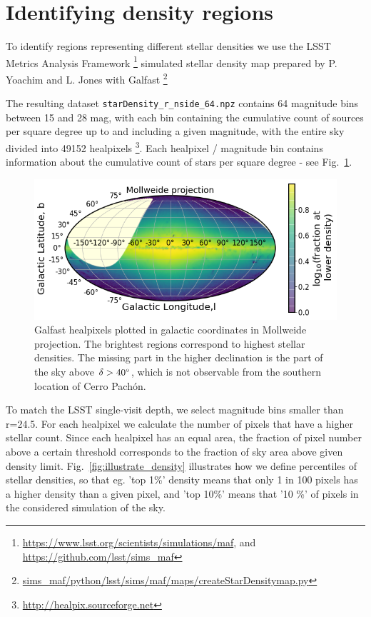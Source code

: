 \documentclass[DM,lsstdraft,toc,usenatbib]{lsstdoc}
\begin{document}
\section{Identifying density regions}
\label{sec:MAF}
To identify regions representing different stellar densities we use the LSST  Metrics Analysis Framework \footnote{\url{https://www.lsst.org/scientists/simulations/maf}, and \url{https://github.com/lsst/sims_maf}} simulated stellar density map prepared by P. Yoachim and L. Jones with Galfast
\footnote{\url{sims_maf/python/lsst/sims/maf/maps/createStarDensitymap.py}}

The  resulting dataset \verb|starDensity_r_nside_64.npz| contains 64 magnitude bins between 15 and 28 mag, with each bin containing the cumulative count of sources per square degree up to and including a given magnitude, with the entire sky divided into 49152  healpixels \footnote{\url{http://healpix.sourceforge.net}}. Each healpixel / magnitude bin  contains information about the cumulative count of stars per square degree - see Fig.~\ref{fig:MAF_densities}.

\begin{figure}
\includegraphics[width=1.0\columnwidth]{figs/01_MAF_densities.png}
\caption{Galfast healpixels plotted in galactic coordinates in Mollweide projection. The brightest regions correspond to highest stellar densities. The missing part in the higher declination is the part of the sky above $\delta>40 \degree$, which is not observable from the southern location of Cerro Pach\'on.}
\label{fig:MAF_densities}
\end{figure} 

To match the LSST single-visit depth,  we select magnitude bins smaller than r=24.5.   For each healpixel we calculate the number of pixels that have a higher stellar count.  Since each healpixel has an equal area, the fraction of pixel number above a certain threshold corresponds to the fraction of sky area above given density limit.  Fig.~\ref{fig:illustrate_density} illustrates how we define percentiles of stellar densities, so that eg. 'top 1\%' density means that only 1 in 100 pixels has a higher density than a given pixel, and 'top 10\%' means that '10 \%' of pixels in the considered simulation of the sky. 
\end{document}
